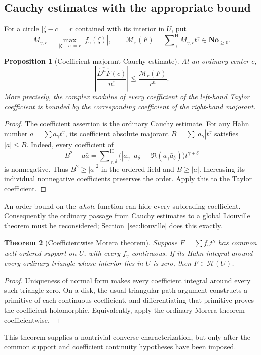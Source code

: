 \documentclass[11pt,oneside]{article}
\newtheorem{theorem}{Theorem}[section]
\newtheorem{proposition}[theorem]{Proposition}
\theoremstyle{definition}\newtheorem{definition}[theorem]{Definition}
\newcommand{\No}{\mathbf{No}}
\newcommand{\HH}{\mathcal H}
\newcommand{\Hsum}{\mathop{\sum}\nolimits^{\mathrm H}}
\begin{document}
\subsection{Cauchy estimates with the appropriate bound}
For a circle $|\zeta-c|=r$ contained with its interior in $U$, put
\[
 M_{\gamma,r}=\max_{|\zeta-c|=r}|f_\gamma(\zeta)|,
 \qquad
 \mathcal M_r(F)=\Hsum_\gamma M_{\gamma,r}t^\gamma\in\No_{\geq0}.
\]
\begin{proposition}[Coefficient-majorant Cauchy estimate]\label{prop:estimate}
At an ordinary center $c$,
\[
 \left|\frac{\widehat{D^nF}(c)}{n!}\right|
 \leq\frac{\mathcal M_r(F)}{r^n}.
\]
More precisely, the complex modulus of every coefficient of the left-hand Taylor coefficient is bounded by the corresponding coefficient of the right-hand majorant.
\end{proposition}
\begin{proof}
The coefficient assertion is the ordinary Cauchy estimate. For any Hahn number $a=\sum a_\gamma t^\gamma$, its coefficient absolute majorant $B=\sum|a_\gamma|t^\gamma$ satisfies $|a|\leq B$. Indeed, every coefficient of
\[
 B^2-a\bar a
 =\Hsum_{\gamma,\delta}
 \bigl(|a_\gamma||a_\delta|-\Re(a_\gamma\bar a_\delta)\bigr)t^{\gamma+\delta}
\]
is nonnegative. Thus $B^2\geq|a|^2$ in the ordered field and $B\geq|a|$. Increasing its individual nonnegative coefficients preserves the order. Apply this to the Taylor coefficient.
\end{proof}
An order bound on the \emph{whole} function can hide every subleading coefficient. Consequently the ordinary passage from Cauchy estimates to a global Liouville theorem must be reconsidered; Section~\ref{sec:liouville} does this exactly.

\begin{theorem}[Coefficientwise Morera theorem]\label{thm:morera}
Suppose $F=\sum f_\gamma t^\gamma$ has common well-ordered support on $U$, with every $f_\gamma$ continuous. If its Hahn integral around every ordinary triangle whose interior lies in $U$ is zero, then $F\in\HH(U)$.
\end{theorem}
\begin{proof}
Uniqueness of normal form makes every coefficient integral around every such triangle zero. On a disk, the usual triangular-path argument constructs a primitive of each continuous coefficient, and differentiating that primitive proves the coefficient holomorphic. Equivalently, apply the ordinary Morera theorem coefficientwise.
\end{proof}
This theorem supplies a nontrivial converse characterization, but only after the common support and coefficient continuity hypotheses have been imposed.
\end{document}
